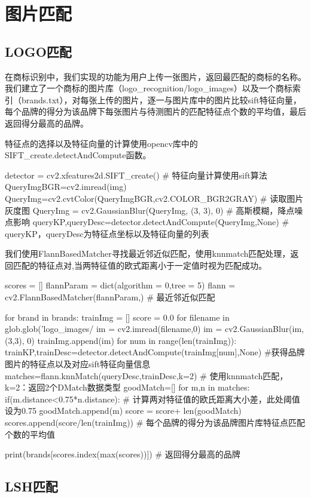 
\chapter{图片匹配}

\section{LOGO匹配}

在商标识别中，我们实现的功能为用户上传一张图片，返回最匹配的商标的名称。我们建立了一个商标的图片库（logo\_recognition/logo\_images）以及一个商标索引（brands.txt），对每张上传的图片，逐一与图片库中的图片比较sift特征向量，每个品牌的得分为该品牌下每张图片与待测图片的匹配特征点个数的平均值，最后返回得分最高的品牌。

特征点的选择以及特征向量的计算使用opencv库中的SIFT\_create.detectAndCompute函数。

\begin{python}
detector = cv2.xfeatures2d.SIFT_create() # 特征向量计算使用sift算法
QueryImgBGR=cv2.imread(img)
QueryImg=cv2.cvtColor(QueryImgBGR,cv2.COLOR_BGR2GRAY) # 读取图片灰度图
QueryImg = cv2.GaussianBlur(QueryImg, (3, 3), 0) # 高斯模糊，降点噪点影响
queryKP,queryDesc=detector.detectAndCompute(QueryImg,None) # queryKP，queryDesc为特征点坐标以及特征向量的列表
\end{python}

我们使用FlannBasedMatcher寻找最近邻近似匹配，使用knnmatch匹配处理，返回匹配的特征点对,当两特征值的欧式距离小于一定值时视为匹配成功。

\begin{python}
scores = []
flannParam = dict(algorithm = 0,tree = 5)
flann = cv2.FlannBasedMatcher(flannParam,{}) # 最近邻近似匹配

for brand in brands:
    trainImg = []
    score = 0.0
    for filename in glob.glob('logo_images/%
        im = cv2.imread(filename,0)
        im = cv2.GaussianBlur(im, (3,3), 0)
        trainImg.append(im)
    for num in range(len(trainImg)):
        trainKP,trainDesc=detector.detectAndCompute(trainImg[num],None) #获得品牌图片的特征点以及对应sift特征向量信息
        matches=flann.knnMatch(queryDesc,trainDesc,k=2) # 使用knnmatch匹配，k=2：返回2个DMatch数据类型
        goodMatch=[]
        for m,n in matches:
            if(m.distance<0.75*n.distance): # 计算两对特征值的欧氏距离大小差，此处阈值设为0.75
                goodMatch.append(m)
        score = score+ len(goodMatch)
    scores.append(score/len(trainImg)) # 每个品牌的得分为该品牌图片库特征点匹配个数的平均值

print(brands[scores.index(max(scores))]) # 返回得分最高的品牌
\end{python}

\section{LSH匹配}
